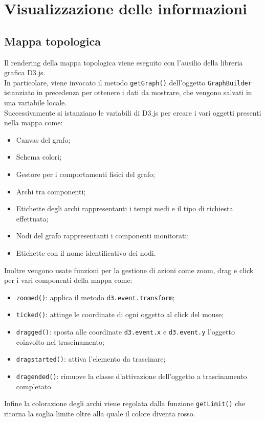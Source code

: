 \section{Visualizzazione delle informazioni}

\subsection{Mappa topologica}
Il rendering della mappa topologica viene eseguito con l'ausilio della libreria grafica D3.js. \\
In particolare, viene invocato il metodo \texttt{getGraph()} dell'oggetto \texttt{GraphBuilder} istanziato in precedenza per ottenere i dati da mostrare, che vengono salvati in una variabile locale. \\
Successivamente si istanziano le variabili di D3.js per creare i vari oggetti presenti nella mappa come:
\begin{itemize}
	\item Canvas del grafo;
	\item Schema colori;
	\item Gestore per i comportamenti fisici del grafo;
	\item Archi tra componenti;
	\item Etichette degli archi rappresentanti i tempi medi e il tipo di richiesta effettuata;
	\item Nodi del grafo rappresentanti i componenti monitorati;
	\item Etichette con il nome identificativo dei nodi.
\end{itemize}
Inoltre vengono usate funzioni per la gestione di azioni come zoom, drag e click per i vari componenti della mappa come:
\begin{itemize}
	\item \texttt{zoomed()}: applica il metodo \texttt{d3.event.transform};
	\item \texttt{ticked()}: attinge le coordinate di ogni oggetto al click del mouse;
	\item \texttt{dragged()}: sposta alle coordinate \texttt{d3.event.x} e \texttt{d3.event.y} l'oggetto coinvolto nel trascinamento;
	\item \texttt{dragstarted()}: attiva l'elemento da trascinare;
	\item \texttt{dragended()}: rimuove la classe d'attivazione dell'oggetto a trascinamento completato.
\end{itemize}

Infine la colorazione degli archi viene regolata dalla funzione \texttt{getLimit()} che ritorna la soglia limite oltre alla quale il colore diventa rosso.


